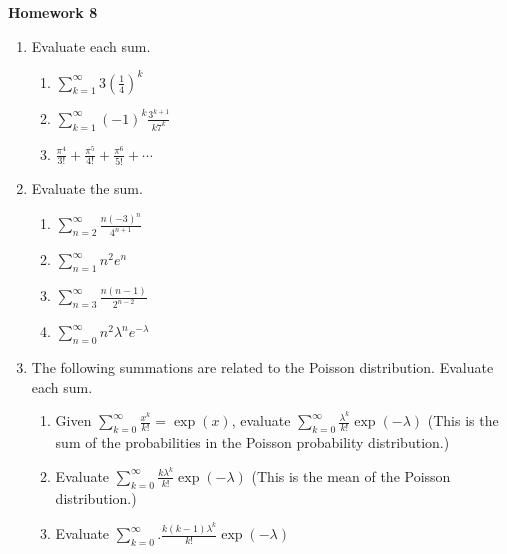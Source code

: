 \documentclass{article}
\begin{document}
\begin{center}
    \large \textbf{Homework 8}
\end{center}
                \begin{enumerate}
                    \item Evaluate each sum.
                        \begin{enumerate}
                            \item $\displaystyle \sum_{k=1}^\infty 3\left(\frac{1}{4}\right)^k$
                            \item $\displaystyle \sum_{k=1}^\infty (-1)^{k}\frac{3^{k+1}}{k7^k}$
                            \item $\displaystyle \frac{\pi^4}{3!}+\frac{\pi^5}{4!}+\frac{\pi^6}{5!}+\cdots$
                        \end{enumerate}
                    \item Evaluate the sum.
                        \begin{enumerate}
                            \item $\displaystyle \sum_{n=2}^\infty \frac{n(-3)^n}{4^{n+1}}$
                            \item $\displaystyle \sum_{n=1}^\infty {n^2e^n}$
                            \item $\displaystyle \sum_{n=3}^\infty \frac{n(n-1)}{2^{n-2}}$
                            \item $\displaystyle \sum_{n=0}^\infty n^2\lambda^n e^{-\lambda}$ 
                        \end{enumerate}
                    \item The following summations are related to the Poisson distribution.  Evaluate each sum.
                        \begin{enumerate}
                            \item Given $\displaystyle \sum_{k=0}^\infty \frac{x^k}{k!}=\exp(x)$, evaluate $\displaystyle\sum_{k=0}^\infty \frac{\lambda^k}{k!}\exp(-\lambda)$  (This is the sum of the probabilities in the Poisson probability distribution.)
                            \item Evaluate $\displaystyle \sum_{k=0}^\infty \frac{k\lambda^k}{k!}\exp(-\lambda)$ (This is the mean of the Poisson distribution.)
                            \item Evaluate $\displaystyle \sum_{k=0}^\infty. \frac{k(k-1)\lambda^k}{k!}\exp(-\lambda)$

\end{enumerate}
\end{enumerate}
\end{document}
